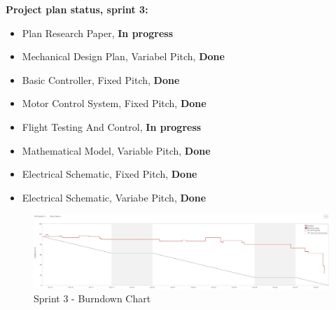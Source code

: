 \textbf{Project plan status, sprint 3:}
\begin{itemize}
    \item Plan Research Paper, \textbf{In progress}
    \item Mechanical Design Plan, Variabel Pitch,  \textbf{Done}
    \item Basic Controller, Fixed Pitch, \textbf{Done}
    \item Motor Control System, Fixed Pitch, \textbf{Done}
    \item Flight Testing And Control, \textbf{In progress}
    \item Mathematical Model, Variable Pitch, \textbf{Done}
    \item Electrical Schematic, Fixed Pitch, \textbf{Done}
    \item Electrical Schematic, Variabe Pitch, \textbf{Done}
\end{itemize}


\begin{figure}[h]
        \centering
        \includegraphics[width = 1\textwidth]{VAPIQ-PICTURES/BDSprint3}
        \caption{Sprint 3 - Burndown Chart}
        \label{fig:bds3}
    \end{figure}
  

